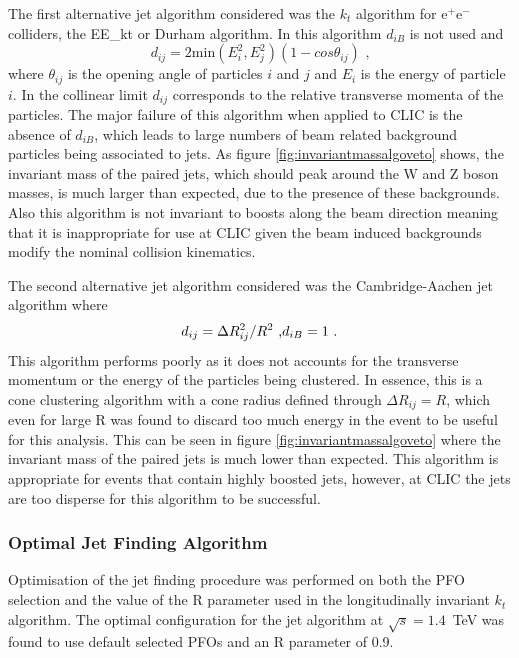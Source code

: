 The first alternative jet algorithm considered was the $k_{t}$ algorithm for $\text{e}^{+}\text{e}^{-}$ colliders, the EE\_kt or Durham algorithm.  In this algorithm $d_{iB}$ is not used and 
%
\begin{equation}
d_{ij} = 2\text{min}(E_{i}^{2}, E_{j}^{2})(1-cos\theta_{ij}) \text{ ,}
\end{equation}
%
\noindent where $\theta_{ij}$ is the opening angle of particles $i$ and $j$ and $E_{i}$ is the energy of particle $i$.  In the collinear limit $d_{ij}$ corresponds to the relative transverse momenta of the particles.  The major failure of this algorithm when applied to CLIC is the absence of $d_{iB}$, which leads to large numbers of beam related background particles being associated to jets.  As figure \ref{fig:invariantmassalgoveto} shows, the invariant mass of the paired jets, which should peak around the W and Z boson masses, is much larger than expected, due to the presence of these backgrounds.  Also this algorithm is not invariant to boosts along the beam direction meaning that it is inappropriate for use at CLIC given the beam induced backgrounds modify the nominal collision kinematics.  

The second alternative jet algorithm considered was the Cambridge-Aachen jet algorithm where 
%
\begin{equation}
d_{ij} = {\Delta}R_{ij}^{2}/R^2 \text{ ,} \\
d_{iB} = 1 \text{ .}
\end{equation}
%
\noindent This algorithm performs poorly as it does not accounts for the transverse momentum or the energy of the particles being clustered. In essence, this is a cone clustering algorithm with a cone radius defined through ${\Delta}R_{ij} = R$, which even for large R was found to discard too much energy in the event to be useful for this analysis.  This can be seen in figure \ref{fig:invariantmassalgoveto} where the invariant mass of the paired jets is much lower than expected.  This algorithm is appropriate for events that contain highly boosted jets, however, at CLIC the jets are too disperse for this algorithm to be successful.


\subsubsection{Optimal Jet Finding Algorithm}
\label{sec:optimaljetalgorithm}
Optimisation of the jet finding procedure was performed on both the PFO selection and the value of the R parameter used in the longitudinally invariant $k_{t}$ algorithm.   The optimal configuration for the jet algorithm at $\sqrt{s}=1.4$~TeV was found to use default selected PFOs and an R parameter of 0.9.

